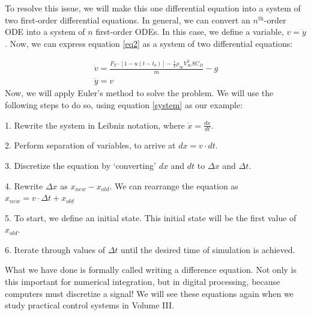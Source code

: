 \documentclass[10pt, openany, titlepage]{book}
\theoremstyle{definition}
\newcounter{example}[chapter]
\begin{document}
To resolve this issue, we will make this one differential equation into a system of two first-order differential equations. In general, we can convert an $n^\text{th}$-order ODE into a system of $n$ first-order ODEs. In this case, we define a variable, $v=\dot{y}$. Now, we can express equation \eqref{eq2} as a system of two differential equations:

\begin{gather}\label{system}
        \dot{v}=\frac{F_T \cdot [1-u(t-t_b)]-\frac{1}{2}\rho_{\infty}V_{\infty}^2SC_D}{m}-g\\
    \dot{y}=v
\end{gather}
Now, we will apply Euler’s method to solve the problem. We will use the following steps to do so, using equation \eqref{system} as our example:

1. Rewrite the system in Leibniz notation, where $\dot{x}=\frac{dx}{dt}$.

2. Perform separation of variables, to arrive at $dx=v\cdot dt$.

3. Discretize the equation by ‘converting’  $dx$ and $dt$ to $\Delta x$ and $\Delta t$.

4. Rewrite $\Delta x$ as $x_{new}-x_{old}$. We can rearrange the equation as $x_{new}=v\cdot \Delta t + x_{old}$

5. To start, we define an initial state. This initial state will be the first value of $x_{old}$. 

6. Iterate through values of $\Delta t$ until the desired time of simulation is achieved.

What we have done is formally called writing a \gls{difference equation}.  Not only is this important for numerical integration, but in digital processing, because computers must discretize a signal! We will see these equations again when we study practical control systems in Volume III.
\end{document}
